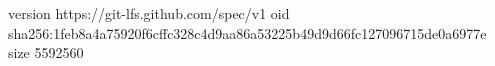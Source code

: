 version https://git-lfs.github.com/spec/v1
oid sha256:1feb8a4a75920f6cffc328c4d9aa86a53225b49d9d66fc127096715de0a6977e
size 5592560
